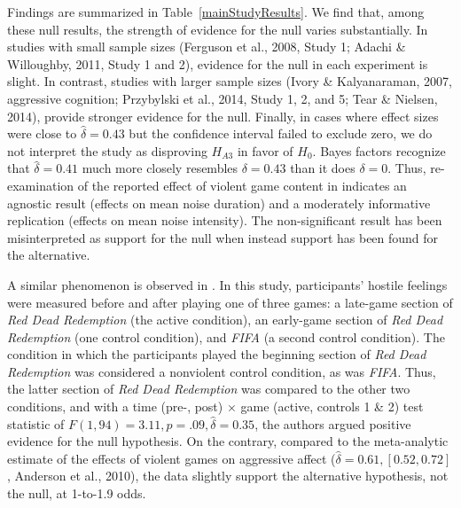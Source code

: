 \documentclass[man]{apa6}
\begin{document}
Findings are summarized in Table~\ref{mainStudyResults}. We find that, among these null results, the strength of evidence for the null varies substantially. In studies with small sample sizes (Ferguson et al., 2008, Study 1; Adachi \& Willoughby, 2011, Study 1 and 2), evidence for the null in each experiment is slight. 
In contrast, studies with larger sample sizes (Ivory \& Kalyanaraman, 2007, aggressive cognition; Przybylski et al., 2014, Study 1, 2, and 5; Tear \& Nielsen, 2014), \nocite{Ivory:Kalyanaraman:2007,Przybylski:etal:2014,Tear:Nielsen:2014} provide stronger evidence for the null.	Finally, in cases where effect sizes were close to $\hat{\delta} = 0.43$ but the confidence interval failed to exclude zero, we do not interpret the study as disproving $H_{A3}$ in favor of $H_0$. Bayes factors recognize that $\hat{\delta} = 0.41$ much more closely resembles $\delta = 0.43$ than it does $\delta = 0$. Thus, re-examination of the reported effect of violent game content in \citet{Elson:etal:2013} indicates an agnostic result (effects on mean noise duration) and a moderately informative replication (effects on mean noise intensity). The non-significant result has been misinterpreted as support for the null when instead support has been found for the alternative.  

A similar phenomenon is observed in \citet{Valadez:Ferguson:2012}. In this study, participants' hostile feelings were measured before and after playing one of three games: a late-game section of {\em Red Dead Redemption} (the active condition), an early-game section of {\em Red Dead Redemption} (one control condition), and {\em FIFA} (a second control condition). The condition in which the participants played the beginning section of {\em Red Dead Redemption} was considered a nonviolent control condition, as was {\em FIFA}. Thus, the latter section of {\em Red Dead Redemption} was compared to the other two conditions, and with a time (pre-, post) $\times$ game (active, controls 1 \& 2) test statistic of $F(1, 94) = 3.11, p = .09, \hat{\delta} = 0.35$, the authors argued positive evidence for the null hypothesis. On the contrary, compared to the meta-analytic estimate of the effects of violent games on aggressive affect ($\hat{\delta} = 0.61, [0.52, 0.72]$, Anderson et al., 2010), the data slightly support the alternative hypothesis, not the null, at 1-to-1.9 odds. 

\end{document}
